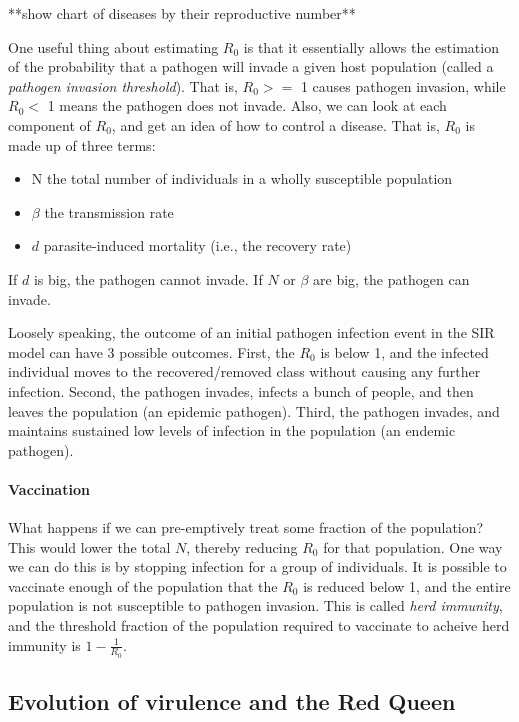 \documentclass[12pt]{article}
\begin{document}
**show chart of diseases by their reproductive number**

One useful thing about estimating $R_0$ is that it essentially allows the estimation of the probability that a pathogen will invade a given host population (called a \textit{pathogen invasion threshold}). That is, $R_0 >=$ 1 causes pathogen invasion, while $R_0 <$ 1 means the pathogen does not invade. Also, we can look at each component of $R_0$, and get an idea of how to control a disease. That is, $R_0$ is made up of three terms:

\begin{itemize}
  \item N the total number of individuals in a wholly susceptible population
  \item $\beta$ the transmission rate
  \item $d$ parasite-induced mortality (i.e., the recovery rate)
\end{itemize}

If $d$ is big, the pathogen cannot invade. 
If $N$ or $\beta$ are big, the pathogen can invade. 



Loosely speaking, the outcome of an initial pathogen infection event in the SIR model can have 3 possible outcomes. First, the $R_0$ is below 1, and the infected individual moves to the recovered/removed class without causing any further infection. Second, the pathogen invades, infects a bunch of people, and then leaves the population (an epidemic pathogen). Third, the pathogen invades, and maintains sustained low levels of infection in the population (an endemic pathogen). 


\paragraph*{Vaccination}

What happens if we can pre-emptively treat some fraction of the population? This would lower the total $N$, thereby reducing $R_0$ for that population. One way we can do this is by stopping infection for a group of individuals. It is possible to vaccinate enough of the population that the $R_0$ is reduced below 1, and the entire population is not susceptible to pathogen invasion. This is called \textit{herd immunity}, and the threshold fraction of the population required to vaccinate to acheive herd immunity is $1 - \frac{1}{R_0}$. 




\bigskip
\subsection*{Evolution of virulence and the Red Queen}
\end{document}
